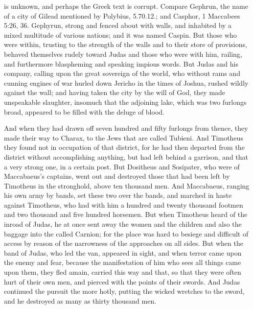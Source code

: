 {{is unknown, and perhaps the Greek text is corrupt. Compare
Gephrun,
the name of a city of Gilead mentioned by Polybius, 5.70.12.; and
Casphor,
1 Maccabees 5:26, 36.
} Gephyrun, strong and fenced about with walls, and inhabited by a mixed multitude of various nations; and it was named Caspin.
But those who were within, trusting to the strength of the walls and to their store of provisions, behaved themselves rudely toward Judas and those who were with him, railing, and furthermore blaspheming and speaking impious words.
But Judas and his company, calling upon the great sovereign of the world, who without rams and cunning engines of war hurled down Jericho in the times of Joshua, rushed wildly against the wall;
and having taken the city by the will of God, they made unspeakable slaughter, insomuch that the adjoining lake, which was two furlongs broad, appeared to be filled with the deluge of blood.
\par }{\PP {}And when they had drawn off seven hundred and fifty furlongs from thence, they made their way to Charax, to the Jews that are called
 Tubieni.
And Timotheus they found not in occupation of that district, for he had then departed from the district without accomplishing anything, but had left behind a garrison, and that a very strong one, in a certain post.
But Dositheus and Sosipater, who were of Maccabaeus’s captains, went out and destroyed those that had been left by Timotheus in the stronghold, above ten thousand men.
And Maccabaeus, ranging his own army by bands, set
 these two over the bands, and marched in haste against Timotheus, who had with him a hundred and twenty thousand footmen and two thousand and five hundred horsemen.
But when Timotheus heard of the inroad of Judas, he at once sent away the women and the children and also the baggage into the
{} called
 Carnion; for the place was hard to besiege and difficult of access by reason of the narrowness of the approaches on all sides.
But when the band of Judas, who led the van, appeared in sight, and when terror came upon the enemy and fear, because the manifestation of him who sees all things came upon them, they fled amain, carried this way and that, so that they were often hurt of their own men, and pierced with the points of their swords.
And Judas continued the pursuit the more hotly, putting the wicked wretches to the sword, and he destroyed as many as thirty thousand men.
}
